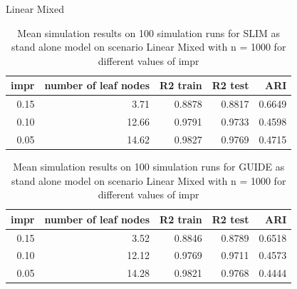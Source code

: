 \documentclass[9pt, xcolor=table]{beamer}
\begin{document}
\begin{frame}{Linear Mixed}
\begin{table}

\caption{Mean simulation results on 100 simulation runs for SLIM as stand alone model on scenario Linear Mixed with n = 1000 for different values of impr }
\centering
\begin{tabular}[t]{r|r|r|r|r}
\hline
impr & number of leaf nodes & R2 train & R2 test & ARI\\
\hline
0.15 & 3.71 & 0.8878 & 0.8817 & 0.6649\\
\hline
0.10 & 12.66 & 0.9791 & 0.9733 & 0.4598\\
\hline
0.05 & 14.62 & 0.9827 & 0.9769 & 0.4715\\
\hline
\end{tabular}
\end{table}

\begin{table}
\caption{Mean simulation results on 100 simulation runs for GUIDE as stand alone model on scenario Linear Mixed with n = 1000 for different values of impr}
\centering
\begin{tabular}[t]{r|r|r|r|r}
\hline
impr & number of leaf nodes & R2 train & R2 test & ARI\\
\hline
0.15 & 3.52 & 0.8846 & 0.8789 & 0.6518\\
\hline
0.10 & 12.12 & 0.9769 & 0.9711 & 0.4573\\
\hline
0.05 & 14.28 & 0.9821 & 0.9768 & 0.4444\\
\hline
\end{tabular}
\end{table}
    
\end{frame}
\end{document}
